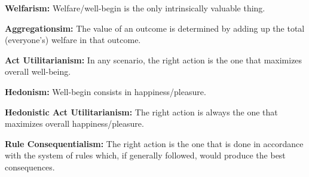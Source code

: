 \documentclass[12pt]{article}
\begin{document}
\textbf{Welfarism:} Welfare/well-begin is the only intrinsically valuable thing.

\textbf{Aggregationsim:} The value of an outcome is determined by adding up the total (everyone's) welfare in that outcome.

\textbf{Act Utilitarianism:} In any scenario, the right action is the one that maximizes overall well-being.

\textbf{Hedonism:} Well-begin consists in happiness/pleasure.

\textbf{Hedonistic Act Utilitarianism:} The right action is always the one that maximizes overall happiness/pleasure.

\textbf{Rule Consequentialism:} The right action is the one that is done in accordance with the system of rules which, if generally followed, would produce the best consequences.
\end{document}

